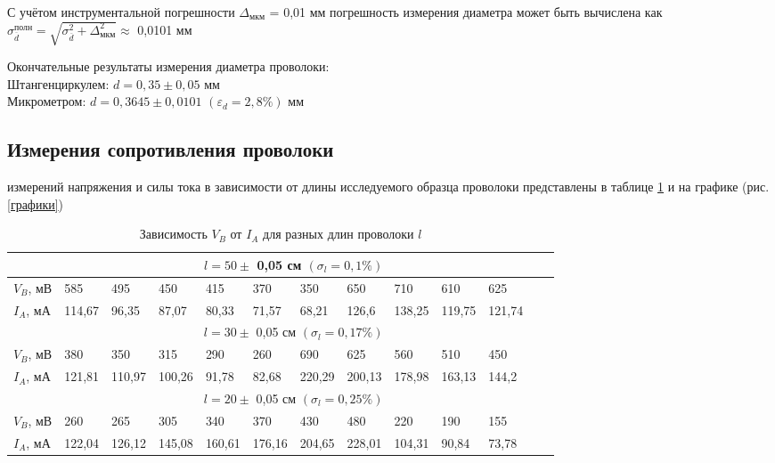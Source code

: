 \documentclass[a4paper,12pt]{article} %
\begin{document}
С учётом инструментальной погрешности $\Delta_\text{мкм}$ = 0,01 мм погрешность измерения диаметра может быть вычислена как $\sigma_{\overline{d}}^\text{полн} = \sqrt{\sigma_{\overline{d}}^2+\Delta_\text{мкм}^2} \approx$ 0,0101 мм
\begin{center}
    Окончательные результаты измерения диаметра проволоки:\\
    Штангенциркулем: $d=0,35 \pm 0,05$ мм\\
    Микрометром: $d=0,3645 \pm 0,0101$ $(\varepsilon_d = 2,8 \%)$ мм\\ 
\end{center}

\subsection{Измерения сопротивления проволоки}
 измерений напряжения и силы тока в зависимости от длины исследуемого образца проволоки представлены в таблице \ref{вахтабл} и на графике (рис. \ref{графики})
\begin{table}[!ht]
    \label{вахтабл}
    \caption{Зависимость $V_B$ от $I_A$ для разных длин проволоки $l$}
    \centering
    \begin{tabular}{|l|l|l|l|l|l|l|l|l|l|l|l|l|}
    \hline
        ~ & \multicolumn{10}{|c|}{$l = 50 \pm$ 0,05 см $(\sigma_l = 0,1 \%)$}\\ \hline
        $V_B$, мВ & 585 & 495 & 450 & 415 & 370 & 350 & 650 & 710 & 610 & 625\\ \hline
        $I_A$, мА & 114,67 & 96,35 & 87,07 & 80,33 & 71,57 & 68,21 & 126,6 & 138,25 & 119,75 & 121,74\\ \hline
        ~ & \multicolumn{10}{|c|}{$l = 30 \pm$ 0,05 см $(\sigma_l = 0,17 \%)$}\\ \hline
        $V_B$, мВ & 380 & 350 & 315 & 290 & 260 & 690 & 625 & 560 & 510 & 450\\ \hline
        $I_A$, мА & 121,81 & 110,97 & 100,26 & 91,78 & 82,68 & 220,29 & 200,13 & 178,98 & 163,13 & 144,2\\ \hline
        ~ & \multicolumn{10}{|c|}{$l = 20 \pm$ 0,05 см $(\sigma_l = 0,25 \%)$}\\ \hline
        $V_B$, мВ & 260 & 265 & 305 & 340 & 370 & 430 & 480 & 220 & 190 & 155\\ \hline
        $I_A$, мА & 122,04 & 126,12 & 145,08 & 160,61 & 176,16 & 204,65 & 228,01 & 104,31 & 90,84 & 73,78\\ \hline
    \end{tabular}
\end{table}
\end{document}
